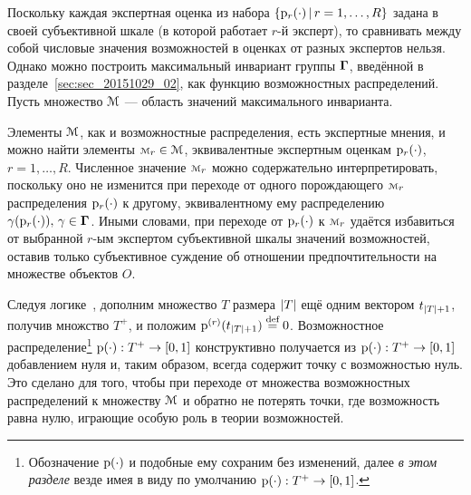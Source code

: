 Поскольку каждая экспертная оценка из набора $\{{\mathrm{p}}_r(\cdot) \,|\, r = 1, \ldots, R\}$ задана в своей субъективной шкале (в которой работает $r$-й эксперт), то сравнивать между собой числовые значения возможностей в оценках от разных экспертов нельзя. Однако можно построить максимальный инвариант группы $\boldsymbol{\Gamma}$, введённой в разделе~\ref{sec:sec_20151029_02}, как функцию возможностных распределений. Пусть множество ${\EuScript{M}}$ --- область значений максимального инварианта. 

Элементы ${\EuScript{M}}$, как и возможностные распределения, есть экспертные мнения, и можно найти элементы $\calm_r \in \calM$, эквивалентные экспертным оценкам ${\mathrm{p}}_r(\cdot)$, $r = 1, \ldots, R$. Численное значение $\calm_r$ можно содержательно интерпретировать, поскольку оно не изменится при переходе от одного порождающего  $\calm_r$ распределения ${\mathrm{p}}_r(\cdot)$ к другому, эквивалентному ему распределению $\gamma({\mathrm{p}}_r(\cdot)),\, \gamma \in \boldsymbol{\Gamma}$. Иными словами, при переходе от ${\mathrm{p}}_r(\cdot)$ к  $\calm_r$ удаётся избавиться от выбранной $r$-ым экспертом субъективной шкалы значений возможностей, оставив только субъективное суждение об отношении предпочтительности на множестве объектов $O$.



Следуя логике~\cite{pytyev_experts}, дополним множество $T$ размера $\left| T \right|$ ещё одним вектором $t_{\left| T \right|+1}$, получив множство $T^+$, и положим ${\mathrm{p}}^{(r)}(t_{\left| T \right|+1}) \overset{\text{def}}{=} 0$. Возможностное распределение\footnote{Обозначение ${\mathrm{p}}(\cdot)$ и подобные ему сохраним без изменений, далее \emph{в этом разделе} везде имея в виду по умолчанию ${\mathrm{p}}(\cdot): T^+ \to[0,1]$.} ${\mathrm{p}}(\cdot): T^+ \to[0,1]$ конструктивно получается из ${\mathrm{p}}(\cdot): T^+ \to[0,1]$ добавлением нуля и, таким образом, всегда содержит точку с возможностью нуль. Это сделано для того, чтобы при переходе от множества возможностных распределений к множеству ${\EuScript{M}}$ и обратно не потерять точки, где возможность равна нулю, играющие особую роль в теории возможностей.

